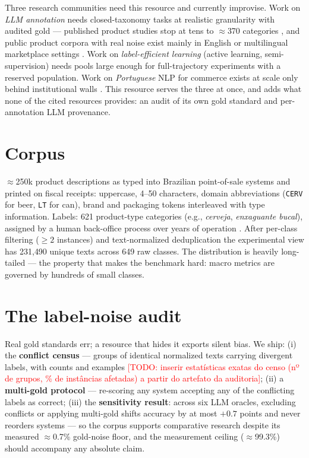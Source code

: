 \documentclass[11pt]{article}
\newcommand{\todo}[1]{\textcolor{red}{[TODO: #1]}}
\begin{document}
Three research communities need this resource and currently improvise.
Work on \emph{LLM annotation} needs closed-taxonomy tasks at realistic
granularity with audited gold --- published product studies stop at
tens to $\approx$370 categories \citep{Roumeliotis2025,Gholamian2024},
and public product corpora with real noise exist mainly in English or
multilingual marketplace settings \citep{Raczkowska2024AlleNoise,
Karl2023}. Work on \emph{label-efficient learning} (active learning,
semi-supervision) needs pools large enough for full-trajectory
experiments with a reserved population. Work on \emph{Portuguese} NLP
for commerce exists at scale only behind institutional walls
\citep{Machado2026RetailPt}. This resource serves the three at once,
and adds what none of the cited resources provides: an audit of its own
gold standard and per-annotation LLM provenance.

\section{Corpus}
\label{sec:corpus}

$\approx$250k product descriptions as typed into Brazilian point-of-sale
systems and printed on fiscal receipts: uppercase, 4--50 characters,
domain abbreviations (\texttt{CERV} for beer, \texttt{LT} for can),
brand and packaging tokens interleaved with type information. Labels:
621 product-type categories (e.g., \emph{cerveja}, \emph{enxaguante
bucal}), assigned by a human back-office process over years of
operation \citep{Daru2022,Daru2024Dissertacao}. After per-class
filtering ($\ge 2$ instances) and text-normalized deduplication the
experimental view has 231{,}490 unique texts across 649 raw classes.
The distribution is heavily long-tailed --- the property that makes the
benchmark hard: macro metrics are governed by hundreds of small classes.

\section{The label-noise audit}
\label{sec:audit}

Real gold standards err; a resource that hides it exports silent bias.
We ship: (i) the \textbf{conflict census} --- groups of identical
normalized texts carrying divergent labels, with counts and examples
\todo{inserir estatísticas exatas do censo (nº de grupos, \% de
instâncias afetadas) a partir do artefato da auditoria};
(ii) a \textbf{multi-gold protocol} --- re-scoring any system accepting
any of the conflicting labels as correct; (iii) the \textbf{sensitivity
result}: across six LLM oracles, excluding conflicts or applying
multi-gold shifts accuracy by at most $+0.7$ points and never reorders
systems --- so the corpus supports comparative research despite its
measured $\approx$0.7\% gold-noise floor, and the measurement ceiling
($\approx$99.3\%) should accompany any absolute claim.
\end{document}
